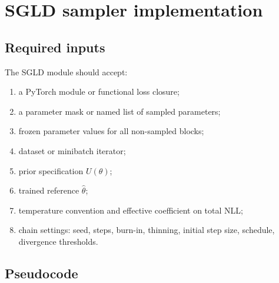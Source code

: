 \documentclass[11pt]{article}
\begin{document}
\section{SGLD sampler implementation}

\subsection{Required inputs}

The SGLD module should accept:
\begin{enumerate}[(1)]
\item a PyTorch module or functional loss closure;
\item a parameter mask or named list of sampled parameters;
\item frozen parameter values for all non-sampled blocks;
\item dataset or minibatch iterator;
\item prior specification $U(\theta)$;
\item trained reference $\hat\theta$;
\item temperature convention and effective coefficient on total NLL;
\item chain settings: seed, steps, burn-in, thinning, initial step size, schedule, divergence thresholds.
\end{enumerate}

\subsection{Pseudocode}
\end{document}
